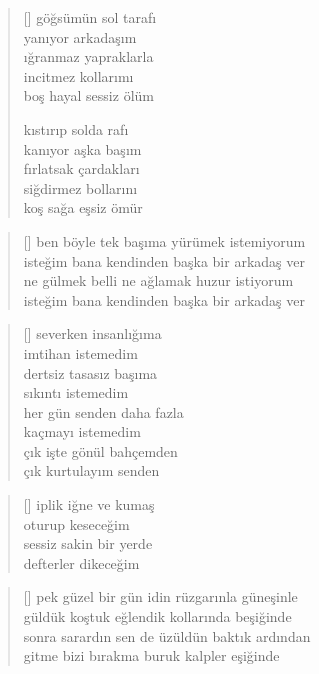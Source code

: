 \documentclass[a5paper, openright, twoside]{memoir}
\begin{document}
\begin{verse}[\versewidth]
  göğsümün sol tarafı \\
  yanıyor arkadaşım \\
  ığranmaz yapraklarla \\
  incitmez kollarımı \\
  boş hayal sessiz ölüm

  kıstırıp solda rafı \\
  kanıyor aşka başım \\
  fırlatsak çardakları \\
  siğdirmez bollarını \\
  koş sağa eşsiz ömür
\end{verse}
\begin{verse}[\versewidth]
  ben böyle tek başıma yürümek istemiyorum \\
  isteğim bana kendinden başka bir arkadaş ver \\
  ne gülmek belli ne ağlamak huzur istiyorum \\
  isteğim bana kendinden başka bir arkadaş ver
\end{verse}
\begin{verse}[\versewidth]
  severken insanlığıma \\
  imtihan istemedim \\
  dertsiz tasasız başıma \\
  sıkıntı istemedim \\
  her gün senden daha fazla \\
  kaçmayı istemedim \\
  çık işte gönül bahçemden \\
  çık kurtulayım senden
\end{verse}
\begin{verse}[\versewidth]
  iplik iğne ve kumaş \\
  oturup keseceğim \\
  sessiz sakin bir yerde \\
  defterler dikeceğim
\end{verse}
\begin{verse}[\versewidth]
  pek güzel bir gün idin rüzgarınla güneşinle \\
  güldük koştuk eğlendik kollarında beşiğinde \\
  sonra sarardın sen de üzüldün baktık ardından \\
  gitme bizi bırakma buruk kalpler eşiğinde
\end{verse}
\end{document}
